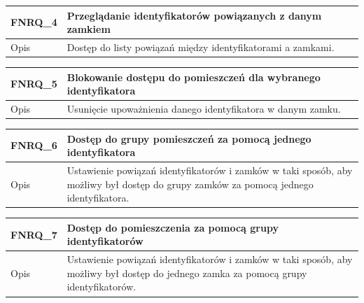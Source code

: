\begin{table}[h!]
\begin{subtable}[c]{\textwidth}
\begin{tabular}{p{2cm}|p{12cm}}
                    FNRQ\_4      & \textbf{Przeglądanie identyfikatorów powiązanych z danym zamkiem} \\
                    \hline Opis         & Dostęp do listy powiązań między identyfikatorami a zamkami. \\
                \end{tabular}
                \label{tbl:fnrq4}
                \vspace{10mm}           
            \end{subtable}
        \quad%
            \begin{subtable}[c]{\textwidth}
                \centering
                 \begin{tabular}{p{2cm}|p{12cm}}
                    FNRQ\_5      & \textbf{Blokowanie dostępu do pomieszczeń dla wybranego identyfikatora}  \\
                    \hline Opis         & Usunięcie upoważnienia danego identyfikatora w danym zamku. \\
                \end{tabular}
                \label{tbl:fnrq5}
                \vspace{10mm}           
            \end{subtable}
        \quad%
            \begin{subtable}[c]{\textwidth}
                \centering
                 \begin{tabular}{p{2cm}|p{12cm}}
                    FNRQ\_6      & \textbf{Dostęp do grupy pomieszczeń za pomocą jednego identyfikatora}  \\
                    \hline Opis         & Ustawienie powiązań identyfikatorów i zamków w taki sposób, aby możliwy był dostęp do grupy zamków za pomocą jednego identyfikatora. \\
                \end{tabular}
                \label{tbl:fnrq6}
                \vspace{10mm}           
            \end{subtable}
        \quad%
            \begin{subtable}[c]{\textwidth}
                \centering
                 \begin{tabular}{p{2cm}|p{12cm}}
                     FNRQ\_7      & \textbf{Dostęp do pomieszczenia za pomocą grupy identyfikatorów}  \\
                    \hline Opis         & Ustawienie powiązań identyfikatorów i zamków w taki sposób, aby możliwy był dostęp do jednego zamka za pomocą grupy identyfikatorów. \\

\end{tabular}
\end{subtable}
\end{table}
